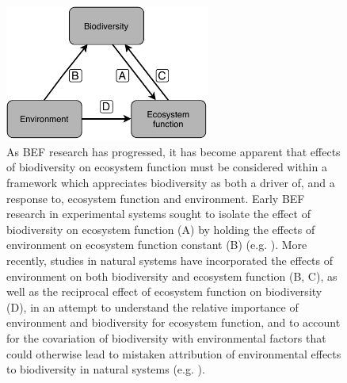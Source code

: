 \begin{refsection}
\begin{figure}[tb]
	\includegraphics[width=0.6\textwidth]{img/plas_befr}
	\caption[Schematic diagram of the interactions among biodiversity, environment, and ecosystem function]{As BEF research has progressed, it has become apparent that effects of biodiversity on ecosystem function must be considered within a framework which appreciates biodiversity as both a driver of, and a response to, ecosystem function and environment. Early BEF research in experimental systems sought to isolate the effect of biodiversity on ecosystem function (A) by holding the effects of environment on ecosystem function constant (B) (e.g. \citealt{Cardinale2009}). More recently, studies in natural systems have incorporated the effects of environment on both biodiversity and ecosystem function (B, C), as well as the reciprocal effect of ecosystem function on biodiversity (D), in an attempt to understand the relative importance of environment and biodiversity for ecosystem function, and to account for the covariation of biodiversity with environmental factors that could otherwise lead to mistaken attribution of environmental effects to biodiversity in natural systems (e.g. \citealt{Mora2014}).} 
	\label{background:plas_befr}
\end{figure}


\end{refsection}
